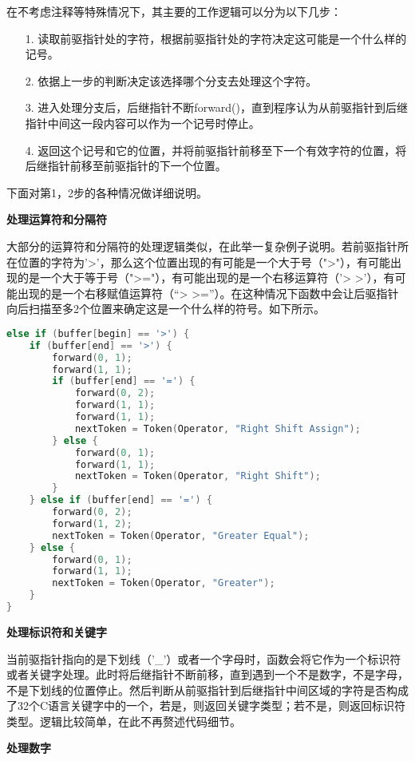 \documentclass[twocolumn]{article}
\begin{document}
在不考虑注释等特殊情况下，其主要的工作逻辑可以分为以下几步：
\begin{itemize}
	\item [1. ]读取前驱指针处的字符，根据前驱指针处的字符决定这可能是一个什么样的记号。
	\item [2. ]依据上一步的判断决定该选择哪个分支去处理这个字符。
	\item [3. ]进入处理分支后，后继指针不断forward()，直到程序认为从前驱指针到后继指针中间这一段内容可以作为一个记号时停止。
	\item [4. ]返回这个记号和它的位置，并将前驱指针前移至下一个有效字符的位置，将后继指针前移至前驱指针的下一个位置。
\end{itemize}
下面对第1，2步的各种情况做详细说明。

\textbf{处理运算符和分隔符 }

大部分的运算符和分隔符的处理逻辑类似，在此举一复杂例子说明。若前驱指针所在位置的字符为'>'，那么这个位置出现的有可能是一个大于号（">"），有可能出现的是一个大于等于号（">="），有可能出现的是一个右移运算符（'> >'），有可能出现的是一个右移赋值运算符（“> >=”）。在这种情况下函数中会让后驱指针向后扫描至多2个位置来确定这是一个什么样的符号。如下所示。
\begin{lstlisting}[language=C++]
else if (buffer[begin] == '>') {
    if (buffer[end] == '>') {
        forward(0, 1);
        forward(1, 1);
        if (buffer[end] == '=') {
            forward(0, 2);
            forward(1, 1);
            forward(1, 1);
            nextToken = Token(Operator, "Right Shift Assign");
        } else {
            forward(0, 1);
            forward(1, 1);
            nextToken = Token(Operator, "Right Shift");
        }
    } else if (buffer[end] == '=') {
        forward(0, 2);
        forward(1, 2);
        nextToken = Token(Operator, "Greater Equal");
    } else {
        forward(0, 1);
        forward(1, 1);
        nextToken = Token(Operator, "Greater");
    }
}
\end{lstlisting}

\textbf{处理标识符和关键字 }

当前驱指针指向的是下划线（'\_'）或者一个字母时，函数会将它作为一个标识符或者关键字处理。此时将后继指针不断前移，直到遇到一个不是数字，不是字母，不是下划线的位置停止。然后判断从前驱指针到后继指针中间区域的字符是否构成了32个C语言关键字中的一个，若是，则返回关键字类型；若不是，则返回标识符类型。逻辑比较简单，在此不再赘述代码细节。

\textbf{处理数字 }
\end{document}
